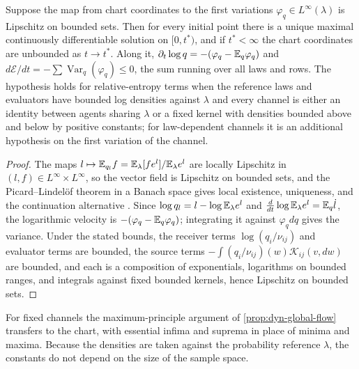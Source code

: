 Suppose the map from chart coordinates to the first variations $\varphi_q\in L^\infty(\lambda)$ is Lipschitz on bounded sets. Then for every initial point there is a unique maximal continuously differentiable solution on $[0,t^*)$, and if $t^*<\infty$ the chart coordinates are unbounded as $t\to t^*$. Along it, $\partial_t\log q=-(\varphi_q-\mathbb E_q\varphi_q)$ and $d\mathcal E/dt=-\sum\operatorname{Var}_q(\varphi_q)\leq0$, the sum running over all laws and rows. The hypothesis holds for relative-entropy terms when the reference laws and evaluators have bounded log densities against $\lambda$ and every channel is either an identity between agents sharing $\lambda$ or a fixed kernel with densities bounded above and below by positive constants; for law-dependent channels it is an additional hypothesis on the first variation of the channel.
\begin{proof}
The maps $l\mapsto\mathbb E_{q_l}f=\mathbb E_\lambda[fe^l]/\mathbb E_\lambda e^l$ are locally Lipschitz in $(l,f)\in L^\infty\times L^\infty$, so the vector field is Lipschitz on bounded sets, and the Picard--Lindel\"of theorem in a Banach space gives local existence, uniqueness, and the continuation alternative \citep{Dieudonne1960}. Since $\log q_l=l-\log\mathbb E_\lambda e^l$ and $\frac{d}{dt}\log\mathbb E_\lambda e^l=\mathbb E_q\dot l$, the logarithmic velocity is $-(\varphi_q-\mathbb E_q\varphi_q)$; integrating it against $\varphi_q dq$ gives the variance. Under the stated bounds, the receiver terms $\log(q_i/\nu_{ij})$ and evaluator terms are bounded, the source terms $-\int(q_i/\nu_{ij})(w)\mathcal K_{ij}(v,dw)$ are bounded, and each is a composition of exponentials, logarithms on bounded ranges, and integrals against fixed bounded kernels, hence Lipschitz on bounded sets.
\end{proof}

For fixed channels the maximum-principle argument of \cref{prop:dyn-global-flow} transfers to the chart, with essential infima and suprema in place of minima and maxima. Because the densities are taken against the probability reference $\lambda$, the constants do not depend on the size of the sample space.


